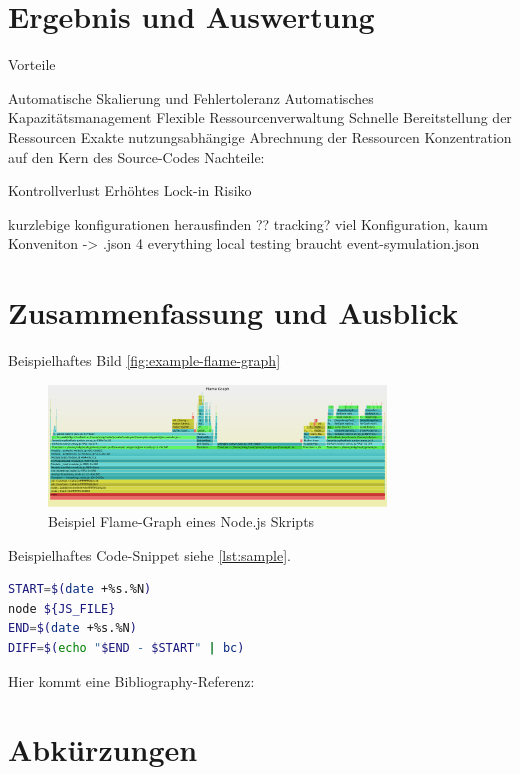 \documentclass[
12pt,
english,
ngerman,
headsepline,
twoside,
openright,
numbers=noenddot,version=first
]{scrreprt}
\begin{document}
\chapter{Ergebnis und Auswertung}
Vorteile

Automatische Skalierung und Fehlertoleranz
Automatisches Kapazitätsmanagement
Flexible Ressourcenverwaltung
Schnelle Bereitstellung der Ressourcen
Exakte nutzungsabhängige Abrechnung der Ressourcen
Konzentration auf den Kern des Source-Codes
Nachteile:

Kontrollverlust
Erhöhtes Lock-in Risiko

kurzlebige konfigurationen herausfinden ?? tracking?
viel Konfiguration, kaum Konveniton -> .json 4 everything
local testing braucht event-symulation.json

\chapter{Zusammenfassung und Ausblick}


Beispielhaftes Bild \autoref{fig:example-flame-graph}

\begin{figure}[h]
	\centering
	\includegraphics[width=0.8\textwidth]{pics/example-flame-graph.eps}
	\caption{Beispiel Flame-Graph eines Node.js Skripts}
	\label{fig:example-flame-graph}
\end{figure}

Beispielhaftes Code-Snippet siehe \autoref{lst:sample}.

\begin{lstlisting}[language=bash,caption={Aufnahme der \glqq real\grqq-Zeit},label={lst:sample}]
START=$(date +%s.%N)
node ${JS_FILE}
END=$(date +%s.%N)
DIFF=$(echo "$END - $START" | bc)
\end{lstlisting}

Hier kommt eine Bibliography-Referenz: \cite{booch2007object}

\lstlistoflistings

\listoffigures

\chapter*{Abkürzungen}
\end{document}
